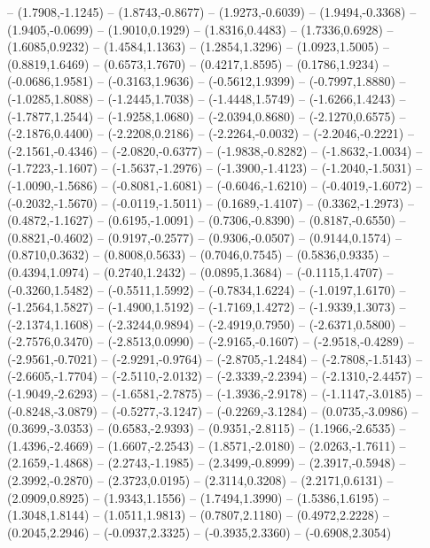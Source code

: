 {	-- (1.7908,-1.1245)
	-- (1.8743,-0.8677)
	-- (1.9273,-0.6039)
	-- (1.9494,-0.3368)
	-- (1.9405,-0.0699)
	-- (1.9010,0.1929)
	-- (1.8316,0.4483)
	-- (1.7336,0.6928)
	-- (1.6085,0.9232)
	-- (1.4584,1.1363)
	-- (1.2854,1.3296)
	-- (1.0923,1.5005)
	-- (0.8819,1.6469)
	-- (0.6573,1.7670)
	-- (0.4217,1.8595)
	-- (0.1786,1.9234)
	-- (-0.0686,1.9581)
	-- (-0.3163,1.9636)
	-- (-0.5612,1.9399)
	-- (-0.7997,1.8880)
	-- (-1.0285,1.8088)
	-- (-1.2445,1.7038)
	-- (-1.4448,1.5749)
	-- (-1.6266,1.4243)
	-- (-1.7877,1.2544)
	-- (-1.9258,1.0680)
	-- (-2.0394,0.8680)
	-- (-2.1270,0.6575)
	-- (-2.1876,0.4400)
	-- (-2.2208,0.2186)
	-- (-2.2264,-0.0032)
	-- (-2.2046,-0.2221)
	-- (-2.1561,-0.4346)
	-- (-2.0820,-0.6377)
	-- (-1.9838,-0.8282)
	-- (-1.8632,-1.0034)
	-- (-1.7223,-1.1607)
	-- (-1.5637,-1.2976)
	-- (-1.3900,-1.4123)
	-- (-1.2040,-1.5031)
	-- (-1.0090,-1.5686)
	-- (-0.8081,-1.6081)
	-- (-0.6046,-1.6210)
	-- (-0.4019,-1.6072)
	-- (-0.2032,-1.5670)
	-- (-0.0119,-1.5011)
	-- (0.1689,-1.4107)
	-- (0.3362,-1.2973)
	-- (0.4872,-1.1627)
	-- (0.6195,-1.0091)
	-- (0.7306,-0.8390)
	-- (0.8187,-0.6550)
	-- (0.8821,-0.4602)
	-- (0.9197,-0.2577)
	-- (0.9306,-0.0507)
	-- (0.9144,0.1574)
	-- (0.8710,0.3632)
	-- (0.8008,0.5633)
	-- (0.7046,0.7545)
	-- (0.5836,0.9335)
	-- (0.4394,1.0974)
	-- (0.2740,1.2432)
	-- (0.0895,1.3684)
	-- (-0.1115,1.4707)
	-- (-0.3260,1.5482)
	-- (-0.5511,1.5992)
	-- (-0.7834,1.6224)
	-- (-1.0197,1.6170)
	-- (-1.2564,1.5827)
	-- (-1.4900,1.5192)
	-- (-1.7169,1.4272)
	-- (-1.9339,1.3073)
	-- (-2.1374,1.1608)
	-- (-2.3244,0.9894)
	-- (-2.4919,0.7950)
	-- (-2.6371,0.5800)
	-- (-2.7576,0.3470)
	-- (-2.8513,0.0990)
	-- (-2.9165,-0.1607)
	-- (-2.9518,-0.4289)
	-- (-2.9561,-0.7021)
	-- (-2.9291,-0.9764)
	-- (-2.8705,-1.2484)
	-- (-2.7808,-1.5143)
	-- (-2.6605,-1.7704)
	-- (-2.5110,-2.0132)
	-- (-2.3339,-2.2394)
	-- (-2.1310,-2.4457)
	-- (-1.9049,-2.6293)
	-- (-1.6581,-2.7875)
	-- (-1.3936,-2.9178)
	-- (-1.1147,-3.0185)
	-- (-0.8248,-3.0879)
	-- (-0.5277,-3.1247)
	-- (-0.2269,-3.1284)
	-- (0.0735,-3.0986)
	-- (0.3699,-3.0353)
	-- (0.6583,-2.9393)
	-- (0.9351,-2.8115)
	-- (1.1966,-2.6535)
	-- (1.4396,-2.4669)
	-- (1.6607,-2.2543)
	-- (1.8571,-2.0180)
	-- (2.0263,-1.7611)
	-- (2.1659,-1.4868)
	-- (2.2743,-1.1985)
	-- (2.3499,-0.8999)
	-- (2.3917,-0.5948)
	-- (2.3992,-0.2870)
	-- (2.3723,0.0195)
	-- (2.3114,0.3208)
	-- (2.2171,0.6131)
	-- (2.0909,0.8925)
	-- (1.9343,1.1556)
	-- (1.7494,1.3990)
	-- (1.5386,1.6195)
	-- (1.3048,1.8144)
	-- (1.0511,1.9813)
	-- (0.7807,2.1180)
	-- (0.4972,2.2228)
	-- (0.2045,2.2946)
	-- (-0.0937,2.3325)
	-- (-0.3935,2.3360)
	-- (-0.6908,2.3054)
}
